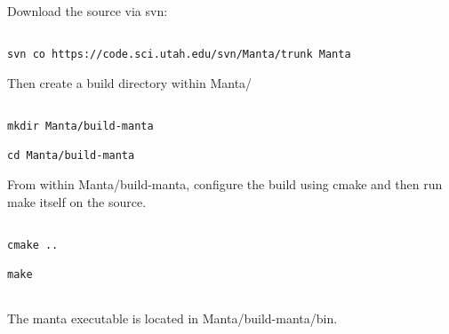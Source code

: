 Download the source via svn:

\begin{Verbatim}

svn co https://code.sci.utah.edu/svn/Manta/trunk Manta

\end{Verbatim}

Then create a build directory within Manta/

\begin{Verbatim}

mkdir Manta/build-manta

cd Manta/build-manta

\end{Verbatim}

From  within Manta/build-manta,  configure the  build using  cmake and
then run  make itself on the  source.

\begin{Verbatim}

cmake ..

make


\end{Verbatim}

The manta executable is located in Manta/build-manta/bin.

